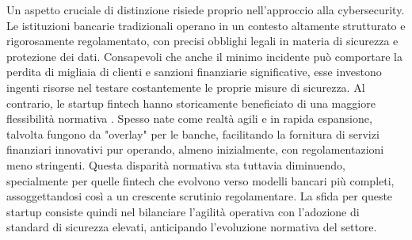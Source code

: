 Un aspetto cruciale di distinzione risiede proprio nell'approc\-cio alla cyber\-security.
Le istituzioni bancarie tradizionali operano in un contesto altamente strutturato e rigorosamente regolamentato, con precisi obblighi legali in materia di sicurezza e protezione dei dati.
Consapevoli che anche il minimo incidente può comportare la perdita di migliaia di clienti e sanzioni finanziarie significative, esse investono ingenti risorse nel testare costantemente le proprie misure di sicurezza.
Al contrario, le startup fintech hanno storicamente beneficiato di una maggiore flessibilità normativa \cite{bankingVsfintech}. Spesso nate come realtà agili e in rapida espansione, talvolta fungono da "overlay" per le banche, facilitando la fornitura di servizi finanziari innovativi pur operando, almeno inizialmente, con regolamentazioni meno stringenti. Questa disparità normativa sta tuttavia diminuendo, specialmente per quelle fintech che evolvono verso modelli bancari più completi, assoggettandosi così a un crescente scrutinio regolamentare. La sfida per queste startup consiste quindi nel bilanciare l'agilità operativa con l'adozione di standard di sicurezza elevati, anticipando l'evoluzione normativa del settore.
\newline


